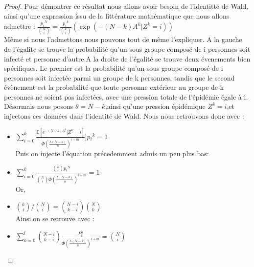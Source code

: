 \begin{proof}
Pour démontrer ce résultat nous allons avoir besoin de l'identitté de Wald, ainsi qu'une expression issu de la littérature mathématique que nous allons admettre :
$ \frac{{p_{i}}^{N}}{\binom{N}{i}}= \frac{{p_{i}}^{k}}{\binom{k}{i}}\left ( \exp(-(N-k)A^{k}|Z^{k}=i)  \right )$\\
Même si nous l'admettons nous pouvons tout de même l'expliquer. A la gauche de l'égalite se trouve la probabilité qu'un sous groupe composé de i personnes soit infecté et personne d'autre.A la droite de l'égalité se trouve deux évenements bien spécifiques. Le premier est la probabilité qu'un sous groupe composé de i personnes soit infectée parmi un groupe de k personnes, tandis que le second évènement est la probabilité que toute personne extérieur au groupe de k personnes ne soient pas infectées, avec une pression totale de l'épidémie égale à i.\\

Désormais nous posons $\theta = N-k$,ainsi qu'une pression épidémique $Z^{k} = i$,et injectons ces données dans l'identité de Wald.
Nous nous retrouvons donc avec :
\begin{itemize}[label=$\bullet$]
	\item $\sum_{i=0}^{k} \frac{ \mathbb{E}[e^{-(N-k) A^{k}}|Z^{k}=i ]}{ \Phi( \frac{\lambda (N-k)}{n})^{i + m} } ]p{_{i}}^{k} = 1$\\
	Puis on injecte l'équation précedemment admis un peu plus bas:\\
	\item $\sum_{i=0}^{k}\frac{\binom{k}{i}p{_{i}}^{N}}{\binom{N}{i}\Phi( \frac{\lambda (N-k)}{n})^{i + m} } = 1$\\
	Or,\\
	\item $\binom{k}{i}/\binom{N}{i} = \binom{N-i}{k-i}\binom{N}{k}$\\
	Ainsi,on se retrouve avec :\\
	\item $\sum_{k=0}^{l}\binom{N-i}{k-i}\frac{P_{k}^{n}}{\Phi( \frac{\lambda (N-k)}{n})^{i + m} }=\binom{N}{i}$
\end{itemize}	


\end{proof}



